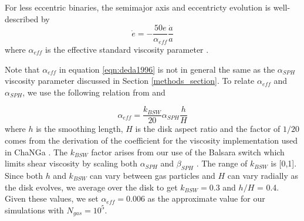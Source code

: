 For less eccentric binaries, the semimajor axis and eccentricty evolution is well-described by 
\begin{equation}
\label{eqn:deda1996}
\dot{e} = -\frac{50e}{\alpha_{eff}}\frac{\dot{a}}{a}
\end{equation}
where $\alpha_{eff}$ is the effective standard viscosity parameter \citep{Arty96b,Dermine2013}.  

Note that $\alpha_{eff}$ in equation \ref{eqn:deda1996} is not in 
general the same as the $\alpha_{SPH}$ viscosity parameter discussed in Section
\ref{methods_section}.  To relate $\alpha_{eff}$ and $\alpha_{SPH}$, we use the following relation from \citet{Lodato10} and \citet{Meru12}

\begin{equation}
\label{eqn:alphas}
\alpha_{eff} = \frac{k_{BSW}}{20} \alpha_{SPH} \frac{h}{H}
\end{equation}
where $h$ is the smoothing length, $H$ is the disk aspect ratio and the factor of $1/20$ comes from the \citet{Meru12} derivation of the coefficient for 
the \citet{Monaghan83} viscosity implementation used in ChaNGa \citep{Murray96}.  The $k_{BSW}$ factor arises from our use of the  Balsara switch which 
limits shear viscosity by scaling both $\alpha_{SPH}$ and $\beta_{SPH}$ \citep{Balsara1995}.  The range of $k_{BSW}$ is [0,1].  Since both $h$ and $k_{BSW}$ 
can vary between gas particles and $H$ can vary radially as the disk evolves, we average over the disk to get $k_{BSW} = 0.3$ and $h/H$ = 0.4.  Given these 
values, we set $\alpha_{eff} = 0.006$ as the approximate value for our simulations with $N_{gas} = 10^5$.

